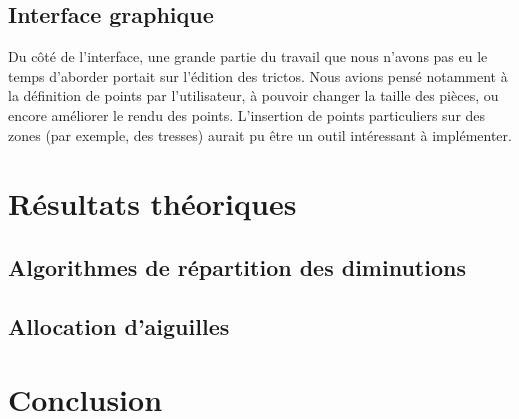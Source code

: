 \documentclass{article}
\begin{document}
\subsection{Interface graphique}

Du côté de l'interface, une grande partie du travail que nous n'avons pas eu le temps d'aborder portait sur l'édition des trictos. Nous avions pensé notamment à la définition de points par l'utilisateur, à pouvoir changer la taille des pièces, ou encore améliorer le rendu des points. L'insertion de points particuliers sur des zones (par exemple, des tresses) aurait pu être un outil intéressant à implémenter.

\section{Résultats théoriques}

\subsection{Algorithmes de répartition des diminutions}

\subsection{Allocation d'aiguilles}

\section*{Conclusion}
\end{document}
